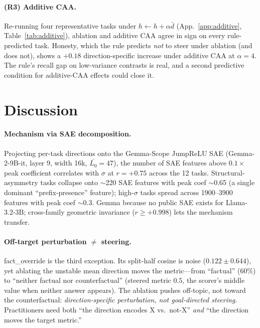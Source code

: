 \documentclass[11pt]{article}
\begin{document}
\paragraph{(R3) Additive CAA.}
Re-running four representative tasks under
$h \leftarrow h + \alpha \bar d$ (App.~\ref{app:additive},
Table~\ref{tab:additive}), ablation and additive CAA agree in sign
on every rule-predicted task. Honesty, which the rule predicts
\emph{not} to steer under ablation (and does not), shows a
$+0.18$ direction-specific increase under additive CAA at $\alpha=4$.
The rule's recall gap on low-variance contrasts is real, and a
second predictive condition for additive-CAA effects could close it.

\section{Discussion}
\label{sec:discussion}

\paragraph{Mechanism via SAE decomposition.}
Projecting per-task directions onto the Gemma-Scope JumpReLU SAE
(Gemma-2-9B-it, layer 9, width 16k, $\bar{L_0}{=}47$), the number
of SAE features above $0.1 \times$ peak coefficient correlates with
$\sigma$ at $r = +0.75$ across the 12 tasks. Structural-asymmetry
tasks collapse onto $\sim$220 SAE features with peak coef $\sim$0.65
(a single dominant ``prefix-presence'' feature); high-$\sigma$ tasks
spread across 1900--3900 features with peak coef $\sim$0.3. Gemma
because no public SAE exists for Llama-3.2-3B; cross-family
geometric invariance ($r \geq +0.998$) lets the mechanism transfer.

\paragraph{Off-target perturbation $\neq$ steering.}
fact\_override is the third exception. Its split-half cosine is
noise ($0.122 \pm 0.644$), yet ablating the unstable mean direction
moves the metric---from ``factual'' (60\%) to ``neither factual nor
counterfactual'' (steered metric $0.5$, the scorer's middle value
when neither answer appears). The ablation pushes off-topic, not
toward the counterfactual: \emph{direction-specific perturbation,
not goal-directed steering}. Practitioners need both ``the
direction encodes X vs.~not-X'' \emph{and} ``the direction moves
the target metric.''
\end{document}
